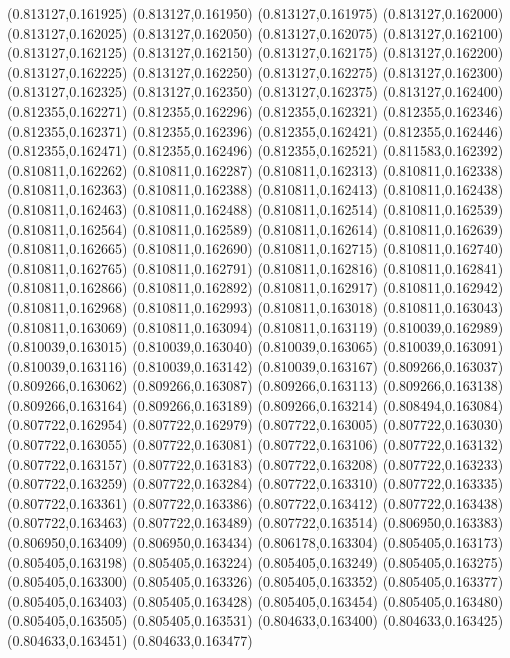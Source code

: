 (0.813127,0.161925)
(0.813127,0.161950)
(0.813127,0.161975)
(0.813127,0.162000)
(0.813127,0.162025)
(0.813127,0.162050)
(0.813127,0.162075)
(0.813127,0.162100)
(0.813127,0.162125)
(0.813127,0.162150)
(0.813127,0.162175)
(0.813127,0.162200)
(0.813127,0.162225)
(0.813127,0.162250)
(0.813127,0.162275)
(0.813127,0.162300)
(0.813127,0.162325)
(0.813127,0.162350)
(0.813127,0.162375)
(0.813127,0.162400)
(0.812355,0.162271)
(0.812355,0.162296)
(0.812355,0.162321)
(0.812355,0.162346)
(0.812355,0.162371)
(0.812355,0.162396)
(0.812355,0.162421)
(0.812355,0.162446)
(0.812355,0.162471)
(0.812355,0.162496)
(0.812355,0.162521)
(0.811583,0.162392)
(0.810811,0.162262)
(0.810811,0.162287)
(0.810811,0.162313)
(0.810811,0.162338)
(0.810811,0.162363)
(0.810811,0.162388)
(0.810811,0.162413)
(0.810811,0.162438)
(0.810811,0.162463)
(0.810811,0.162488)
(0.810811,0.162514)
(0.810811,0.162539)
(0.810811,0.162564)
(0.810811,0.162589)
(0.810811,0.162614)
(0.810811,0.162639)
(0.810811,0.162665)
(0.810811,0.162690)
(0.810811,0.162715)
(0.810811,0.162740)
(0.810811,0.162765)
(0.810811,0.162791)
(0.810811,0.162816)
(0.810811,0.162841)
(0.810811,0.162866)
(0.810811,0.162892)
(0.810811,0.162917)
(0.810811,0.162942)
(0.810811,0.162968)
(0.810811,0.162993)
(0.810811,0.163018)
(0.810811,0.163043)
(0.810811,0.163069)
(0.810811,0.163094)
(0.810811,0.163119)
(0.810039,0.162989)
(0.810039,0.163015)
(0.810039,0.163040)
(0.810039,0.163065)
(0.810039,0.163091)
(0.810039,0.163116)
(0.810039,0.163142)
(0.810039,0.163167)
(0.809266,0.163037)
(0.809266,0.163062)
(0.809266,0.163087)
(0.809266,0.163113)
(0.809266,0.163138)
(0.809266,0.163164)
(0.809266,0.163189)
(0.809266,0.163214)
(0.808494,0.163084)
(0.807722,0.162954)
(0.807722,0.162979)
(0.807722,0.163005)
(0.807722,0.163030)
(0.807722,0.163055)
(0.807722,0.163081)
(0.807722,0.163106)
(0.807722,0.163132)
(0.807722,0.163157)
(0.807722,0.163183)
(0.807722,0.163208)
(0.807722,0.163233)
(0.807722,0.163259)
(0.807722,0.163284)
(0.807722,0.163310)
(0.807722,0.163335)
(0.807722,0.163361)
(0.807722,0.163386)
(0.807722,0.163412)
(0.807722,0.163438)
(0.807722,0.163463)
(0.807722,0.163489)
(0.807722,0.163514)
(0.806950,0.163383)
(0.806950,0.163409)
(0.806950,0.163434)
(0.806178,0.163304)
(0.805405,0.163173)
(0.805405,0.163198)
(0.805405,0.163224)
(0.805405,0.163249)
(0.805405,0.163275)
(0.805405,0.163300)
(0.805405,0.163326)
(0.805405,0.163352)
(0.805405,0.163377)
(0.805405,0.163403)
(0.805405,0.163428)
(0.805405,0.163454)
(0.805405,0.163480)
(0.805405,0.163505)
(0.805405,0.163531)
(0.804633,0.163400)
(0.804633,0.163425)
(0.804633,0.163451)
(0.804633,0.163477)
